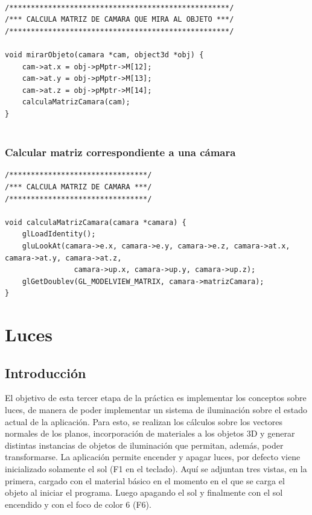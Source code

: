 \documentclass[12pt,a4paper]{article}
\begin{document}
\begin{lstlisting}

/***************************************************/
/*** CALCULA MATRIZ DE CAMARA QUE MIRA AL OBJETO ***/
/***************************************************/

void mirarObjeto(camara *cam, object3d *obj) {
    cam->at.x = obj->pMptr->M[12];
    cam->at.y = obj->pMptr->M[13];
    cam->at.z = obj->pMptr->M[14];
    calculaMatrizCamara(cam);
}


\end{lstlisting}


\subsubsection{Calcular matriz correspondiente a una cámara}

\begin{lstlisting}
/********************************/
/*** CALCULA MATRIZ DE CAMARA ***/
/********************************/

void calculaMatrizCamara(camara *camara) {
    glLoadIdentity();
    gluLookAt(camara->e.x, camara->e.y, camara->e.z, camara->at.x, camara->at.y, camara->at.z, 
    			camara->up.x, camara->up.y, camara->up.z);
    glGetDoublev(GL_MODELVIEW_MATRIX, camara->matrizCamara);
}
\end{lstlisting}









\newpage

\section{Luces}

\subsection{Introducción}

El objetivo de esta tercer etapa de la práctica es implementar los conceptos sobre luces, de manera de poder implementar un sistema de iluminación sobre el estado actual de la aplicación. Para esto, se realizan los cálculos sobre los vectores normales de los planos, incorporación de materiales a los objetos 3D y generar distintas instancias de objetos de iluminación que permitan, además, poder transformarse.
La aplicación permite encender y apagar luces, por defecto viene inicializado solamente el sol (F1 en el teclado). Aquí se adjuntan tres vistas, en la primera, cargado con el material básico en el momento en el que se carga el objeto al iniciar el programa. Luego apagando el sol y finalmente con el sol encendido y con el foco de color 6 (F6).
\end{document}
